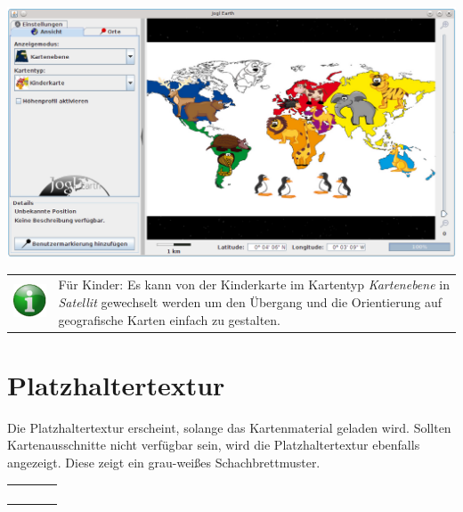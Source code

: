 \documentclass[10pt]{scrreprt}
\newcommand{\textref}[1]{\mbox{\raisebox{0.1ex}{\small$\rightarrow$ }\textit{#1}}}
\begin{document}
\vspace{3mm}
\begin{center}
\includegraphics[scale=0.3]{images/flacheKarte_Kinderweltkarte.png}
\end{center}

\vspace{3mm}
\begin{tabular}{>{\centering \arraybackslash}m{1cm} m{14cm}}
\includegraphics[scale=0.5]{images/info.eps} &  Für Kinder: Es kann von der Kinderkarte im Kartentyp \textref{Kartenebene} in \textref{Satellit} gewechselt werden um den Übergang und die Orientierung auf geografische Karten einfach zu gestalten.
\end{tabular}



\vspace{3mm}
\section*{Platzhaltertextur} 
\begin{minipage}[t]{9cm}
\vspace{-20mm}
Die Platzhaltertextur erscheint, solange das Kartenmaterial geladen wird. Sollten Kartenausschnitte nicht verfügbar sein, wird die Platzhaltertextur ebenfalls angezeigt. Diese zeigt ein grau-weißes Schachbrettmuster.
\end{minipage}
\begin{minipage}{7cm}
\centering
\begin{tabular}{p{0.7cm}p{0.7cm}p{0.7cm}p{0.7cm}}
\parbox[0pt][1cm][c]{0cm}{}  & &  &  \\ 
\parbox[0pt][1cm][c]{0cm}{} &  & & \\ 
\parbox[0pt][1cm][c]{0cm}{}  & &  &  \\ 
\parbox[0pt][1cm][c]{0cm}{} &  & & \\ 
\end{tabular}
\end{minipage}
\end{document}
